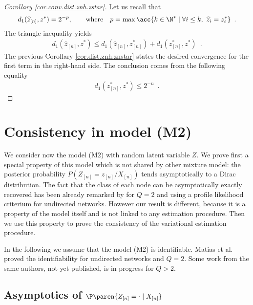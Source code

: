 \documentclass[11pt]{article}
\newtheorem{proof}{Proof}%
\newcommand{\Xn}{X_{[n]}}
\newcommand{\Zn}{Z_{[n]}}
\newcommand{\zn}{z_{[n]}}
\newcommand{\znh}{\widehat{z}_{[n]}}
\newcommand{\zh}{\widehat{z}}
\begin{document}
\begin{proof}[Corollary \ref{cor.conv.dist.znh.zstar}]
Let us recall that
\begin{align*}
        d_1(\znh,z^*) = 2^{-p},\qquad \mathrm{where}\quad p=\max\acc{k\in\N^*\mid \forall i\leq k,\ \zh_i=z^*_i}\enspace.
\end{align*}
The triangle inequality yields
\begin{align*}
        d_1(\znh,z^*) \leq d_1(\znh,\zn^*) +d_1(\zn^*,z^*)\enspace.
\end{align*}
The previous Corollary \ref{cor.dist.znh.znstar} states the desired convergence for the first term in the right-hand side.
%
The conclusion comes from the following equality
\begin{align*}
        d_1(\zn^*,z^*) \leq 2^{-n}\enspace.
\end{align*}
\end{proof}














\section{Consistency in model (M2)}

We consider now the model (M2) with random latent variable $Z$. We prove first a special property of this model which is not shared by other mixture model: the posterior probability $P(\Zn=\zn/\Xn)$ tends asymptotically to a Dirac distribution. The fact that the class of each node can be asymptotically exactly recovered has been already remarked by \cite{SN} for $Q=2$ and \cite{BC} using a profile likelihood criterium for undirected networks. However our result is different, because it is a property of the model itself and is not linked to any estimation procedure. Then we use this property to prove the consistency of the variational estimation procedure.



In the following we assume that the model (M2) is identifiable. Matias et al. \cite{AMR} proved the identifiability for undirected networks and $Q=2$. Some work from the same authors, not yet published, is in progress for $Q>2$.




\subsection{Asymptotics of $\P\paren{\Zn=\cdot\mid \Xn}$}
\end{document}
